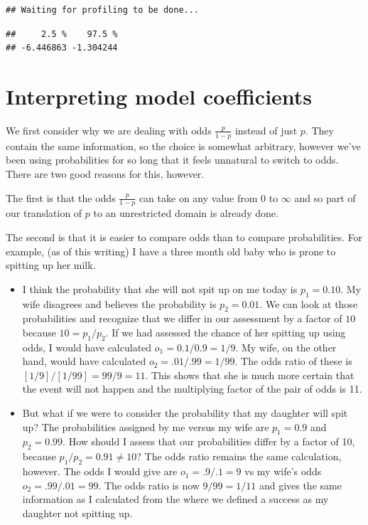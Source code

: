 \documentclass[]{book}
\theoremstyle{definition}
\theoremstyle{definition}
\theoremstyle{remark}
\begin{document}
\begin{verbatim}
## Waiting for profiling to be done...
\end{verbatim}

\begin{verbatim}
##     2.5 %    97.5 % 
## -6.446863 -1.304244
\end{verbatim}

\section{Interpreting model
coefficients}\label{interpreting-model-coefficients}

We first consider why we are dealing with odds \(\frac{p}{1-p}\) instead
of just \(p\). They contain the same information, so the choice is
somewhat arbitrary, however we've been using probabilities for so long
that it feels unnatural to switch to odds. There are two good reasons
for this, however.

The first is that the odds \(\frac{p}{1-p}\) can take on any value from
\(0\) to \(\infty\) and so part of our translation of \(p\) to an
unrestricted domain is already done.

The second is that it is easier to compare odds than to compare
probabilities. For example, (as of this writing) I have a three month
old baby who is prone to spitting up her milk.

\begin{itemize}
\item
  I think the probability that she will not spit up on me today is
  \(p_{1}=0.10\). My wife disagrees and believes the probability is
  \(p_{2}=0.01\). We can look at those probabilities and recognize that
  we differ in our assessment by a factor of \(10\) because
  \(10=p_{1}/p_{2}\). If we had assessed the chance of her spitting up
  using odds, I would have calculated \(o_{1}=0.1/0.9=1/9\). My wife, on
  the other hand, would have calculated \(o_{2}=.01/.99=1/99\). The odds
  ratio of these is \(\left[1/9\right] / \left[1/99\right] = 99/9 =11\).
  This shows that she is much more certain that the event will not
  happen and the multiplying factor of the pair of odds is 11.
\item
  But what if we were to consider the probability that my daughter will
  spit up? The probabilities assigned by me versus my wife are
  \(p_{1}=0.9\) and \(p_{2}=0.99\). How should I assess that our
  probabilities differ by a factor of 10, because
  \(p_{1}/p_{2}=0.91\ne10\)? The odds ratio remains the same
  calculation, however. The odds I would give are \(o_1=.9/.1=9\) vs my
  wife's odds \(o_2 = .99/.01 = 99\). The odds ratio is now
  \(9/99=1/11\) and gives the same information as I calculated from the
  where we defined a success as my daughter not spitting up.
\end{itemize}
\end{document}
